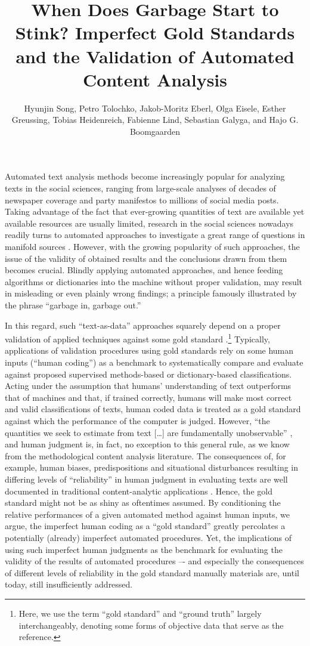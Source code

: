 \documentclass[man, floatsintext, 12pt, a4paper, noextraspace]{apa6}
\title{When Does Garbage Start to Stink? Imperfect Gold Standards and the Validation of Automated Content Analysis}
\author{\addvspace{.25in} Hyunjin Song, Petro Tolochko, Jakob-Moritz Eberl, Olga Eisele, Esther Greussing, Tobias Heidenreich, Fabienne Lind, Sebastian Galyga, and Hajo G. Boomgaarden}
\affiliation{Department of Communication, University of Vienna, Austria}
\begin{document}
\setcounter{page}{0}
\maketitle
    Automated text analysis methods become increasingly popular for analyzing texts in the social sciences, ranging from large-scale analyses of decades of newspaper coverage and party manifestos to millions of social media posts. Taking advantage of the fact that ever-growing quantities of text are available yet available resources are usually limited, research in the social sciences nowadays readily turns to automated approaches to investigate a great range of questions in manifold sources \parencite{Boumans_Trilling_2016, grimmer2013text}. However, with the growing popularity of such approaches, the issue of the validity of obtained results and the conclusions drawn from them becomes crucial. Blindly applying automated approaches, and hence feeding algorithms or dictionaries into the machine without proper validation, may result in misleading or even plainly wrong findings; a principle famously illustrated by the phrase \enquote{garbage in, garbage out.} 
    
    In this regard, such \enquote{text-as-data} approaches squarely depend on a proper validation of applied techniques against some gold standard \parencite{grimmer2013text}.\footnote{ Here, we use the term \enquote{gold standard} and \enquote{ground truth} largely interchangeably, denoting some forms of objective data that serve as the reference.} Typically, applications of validation procedures using gold standards rely on some human inputs (\enquote{human coding}) as a  benchmark to systematically compare and evaluate against proposed supervised methods-based or dictionary-based classifications. Acting under the assumption that humans’ understanding of text outperforms that of machines and that, if trained correctly, humans will make most correct and valid classifications of texts, human coded data is treated as a gold standard against which the performance of the computer is judged. However, “the quantities we seek to estimate from text [\ldots] are fundamentally unobservable” \parencite[p. 299]{lowe2013validating}, and human judgment is, in fact, no exception to this general rule, as we know from the methodological content analysis literature. The consequences of, for example, human biases, predispositions and situational disturbances resulting in differing levels of “reliability” in human judgment in evaluating texts are well documented in traditional content-analytic applications \parencite[e.g.,][]{krippendorff2004reliability, hayes2007answering, lombard2002content, ennser2018impact}. Hence, the gold standard might not be as shiny as oftentimes assumed. By conditioning the relative performances of a given automated method against human inputs, we argue, the imperfect human coding as a “gold standard” greatly percolates a potentially (already) imperfect automated procedures. Yet, the implications of using such imperfect human judgments as the benchmark for evaluating the validity of the results of automated procedures –- and especially the consequences of different levels of reliability in the gold standard manually materials are, until today, still insufficiently addressed. 
    
\end{document}
